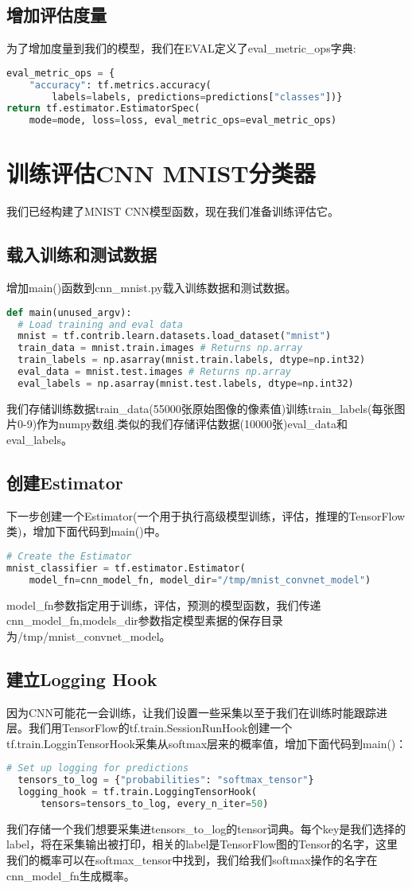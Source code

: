 \subsection{增加评估度量}
为了增加度量到我们的模型，我们在EVAL定义了eval\_metric\_ops字典:
\begin{lstlisting}[language=Python]
eval_metric_ops = {
    "accuracy": tf.metrics.accuracy(
        labels=labels, predictions=predictions["classes"])}
return tf.estimator.EstimatorSpec(
    mode=mode, loss=loss, eval_metric_ops=eval_metric_ops)
\end{lstlisting}
\section{训练评估CNN MNIST分类器}
我们已经构建了MNIST CNN模型函数，现在我们准备训练评估它。
\subsection{载入训练和测试数据}
增加main()函数到cnn\_mnist.py载入训练数据和测试数据。
\begin{lstlisting}[language=Python]
def main(unused_argv):
  # Load training and eval data
  mnist = tf.contrib.learn.datasets.load_dataset("mnist")
  train_data = mnist.train.images # Returns np.array
  train_labels = np.asarray(mnist.train.labels, dtype=np.int32)
  eval_data = mnist.test.images # Returns np.array
  eval_labels = np.asarray(mnist.test.labels, dtype=np.int32)
\end{lstlisting}
我们存储训练数据train\_data(55000张原始图像的像素值)训练train\_labels(每张图片0-9)作为numpy数组.类似的我们存储评估数据(10000张)eval\_data和eval\_labels。
\subsection{创建Estimator}
下一步创建一个Estimator(一个用于执行高级模型训练，评估，推理的TensorFlow类)，增加下面代码到main()中。
\begin{lstlisting}[language=Python]
# Create the Estimator
mnist_classifier = tf.estimator.Estimator(
    model_fn=cnn_model_fn, model_dir="/tmp/mnist_convnet_model")
\end{lstlisting}
model\_fn参数指定用于训练，评估，预测的模型函数，我们传递cnn\_model\_fn,models\_dir参数指定模型素据的保存目录为/tmp/mnist\_convnet\_model。
\subsection{建立Logging Hook}
因为CNN可能花一会训练，让我们设置一些采集以至于我们在训练时能跟踪进层。我们用TensorFlow的tf.train.SessionRunHook创建一个tf.train.LogginTensorHook采集从softmax层来的概率值，增加下面代码到main()：
\begin{lstlisting}[language=Python]
# Set up logging for predictions
  tensors_to_log = {"probabilities": "softmax_tensor"}
  logging_hook = tf.train.LoggingTensorHook(
      tensors=tensors_to_log, every_n_iter=50)
\end{lstlisting}
我们存储一个我们想要采集进tensors\_to\_log的tensor词典。每个key是我们选择的label，将在采集输出被打印，相关的label是TensorFlow图的Tensor的名字，这里我们的概率可以在softmax\_tensor中找到，我们给我们softmax操作的名字在cnn\_model\_fn生成概率。

